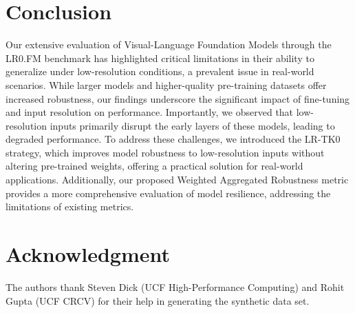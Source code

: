 \section{Conclusion}

Our extensive evaluation of Visual-Language Foundation Models through the LR0.FM benchmark has highlighted critical limitations in their ability to generalize under low-resolution conditions, a prevalent issue in real-world scenarios. While larger models and higher-quality pre-training datasets offer increased robustness, our findings underscore the significant impact of fine-tuning and input resolution on performance. Importantly, we observed that low-resolution inputs primarily disrupt the early layers of these models, leading to degraded performance. To address these challenges, we introduced the LR-TK0 strategy, which improves model robustness to low-resolution inputs without altering pre-trained weights, offering a practical solution for real-world applications. Additionally, our proposed Weighted Aggregated Robustness metric provides a more comprehensive evaluation of model resilience, addressing the limitations of existing metrics.



\section{Acknowledgment}
The authors thank Steven Dick (UCF High-Performance Computing) and Rohit Gupta (UCF CRCV) for their help in generating the synthetic data set. 